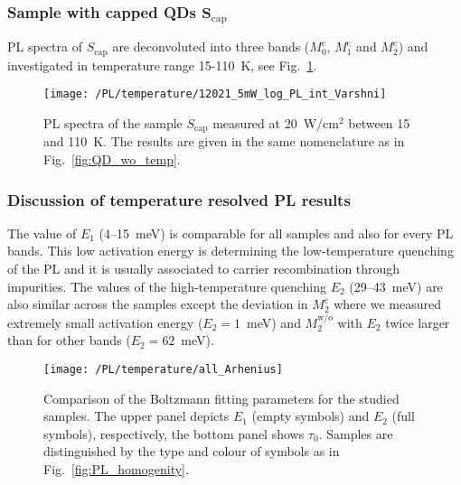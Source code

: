 \newpage
\subsubsection*{Sample with capped QDs $\mathbf{S_\mathrm{cap}}$}
%
PL spectra of ${S_\mathrm{cap}}$ are deconvoluted into three bands ($M_0^\mathrm{c}$, $M_1^\mathrm{c}$ and $M_2^\mathrm{c}$) and investigated in temperature range 15-110~K, see Fig.~\ref{fig:QD_c_temp}.
%
\begin{figure}[h]
	\centering
	\texttt{[image: /PL/temperature/12021\_5mW\_log\_PL\_int\_Varshni]}
	\caption{PL spectra of the sample ${S_\mathrm{cap}}$ measured at 20~W/cm$^2$ between 15 and 110~K. The results are given in the same nomenclature as in Fig.~\ref{fig:QD_wo_temp}.}
	\label{fig:QD_c_temp}
\end{figure}

\newpage
\subsubsection*{Discussion of temperature resolved PL results}
The value of $E_1$ (4--15~meV) is comparable for all samples and also for every PL bands. This low activation energy is determining the low-temperature quenching of the PL and it is usually associated to carrier recombination through impurities. The values of the high-temperature quenching $E_2$ (29--43~meV) are also similar across the samples except the deviation in $M_2^\mathrm{c}$ where we measured extremely small activation energy ($E_2=1$~meV) and $M_2^\mathrm{w/o}$ with $E_2$ twice larger than for other bands ($E_2=62$~meV).

\begin{figure}
	\centering
	\texttt{[image: /PL/temperature/all\_Arhenius]}
	\caption{Comparison of the Boltzmann fitting parameters for the studied samples. The upper panel depicts $E_1$ (empty symbols) and $E_2$ (full symbols), respectively, the bottom panel shows $\tau_0$. Samples are distinguished by the type and colour of symbols as in Fig.~\ref{fig:PL_homogenity}.}
	\label{fig:Arrhenius_all}
\end{figure}


